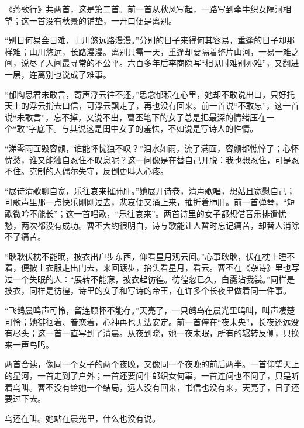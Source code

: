 \begin{appreciation}
《燕歌行》共两首，这是第二首。前一首从秋风写起，一路写到牵牛织女隔河相望；这一首没有秋景的铺垫，一开口便是离别。

“别日何易会日难，山川悠远路漫漫。”分别的日子来得何其容易，重逢的日子却那样难；山川悠远，长路漫漫。离别只需一天，重逢却要隔着整片山河，一易一难之间，说尽了人间最寻常的不公平。六百多年后李商隐写“相见时难别亦难”，又翻进一层，连离别也说成了难事。

“郁陶思君未敢言，寄声浮云往不还。”思念郁积在心里，她却不敢说出口，只好托天上的浮云捎去口信，可浮云飘走了，再也没有回来。前一首说“不敢忘”，这一首说“未敢言”，忘不掉，又说不出，曹丕笔下的女子总是把最深的情绪压在一个“敢”字底下。与其说这是闺中女子的羞怯，不如说是写诗人的性情。

“涕零雨面毁容颜，谁能怀忧独不叹？”泪水如雨，流了满面，容颜都憔悴了；心怀忧愁，谁又能独自忍住不叹息呢？这一问像是在替自己开脱：我也想忍住，可是忍不住。克制的人偶尔失守，反倒更叫人心疼。

“展诗清歌聊自宽，乐往哀来摧肺肝。”她展开诗卷，清声歌唱，想姑且宽慰自己；可歌声里那一点快乐刚刚过去，悲哀便又涌上来，摧折着肺肝。前一首弹琴，“短歌微吟不能长”；这一首唱歌，“乐往哀来”。两首诗里的女子都想借音乐排遣忧愁，两次都没有成功。曹丕大约很明白，诗与歌能让人暂时忘记痛苦，却替人消除不了痛苦。

“耿耿伏枕不能眠，披衣出户步东西，仰看星月观云间。”心事耿耿，伏在枕上睡不着，便披上衣服走出门去，来回踱步，抬头看星月，看云。曹丕在《杂诗》里也写过一个失眠的人：“展转不能寐，披衣起彷徨。彷徨忽已久，白露沾我裳。”同样是披衣，同样是彷徨，诗里的女子和写诗的帝王，在许多个长夜里做着同一件事。

“飞鸧晨鸣声可怜，留连顾怀不能存。”天亮了，一只鸧鸟在晨光里鸣叫，叫声凄楚可怜；她徘徊着、眷恋着，心神再也无法安定。前一首停在“夜未央”，长夜还远没有尽头；这一首一直写到了清晨。从夜到晓，她一夜未眠，所有的辗转反侧，只换来一声鸟鸣。

两首合读，像同一个女子的两个夜晚，又像同一个夜晚的前后两半。一首仰望天上的星河，一首走到了户外；一首还要问牛郎织女何辜，一首连问也不问了，只是听着鸟叫。曹丕没有给她一个结局，远人没有回来，书信也没有来，天亮了，日子还要过下去。

鸟还在叫。她站在晨光里，什么也没有说。
\end{appreciation}
